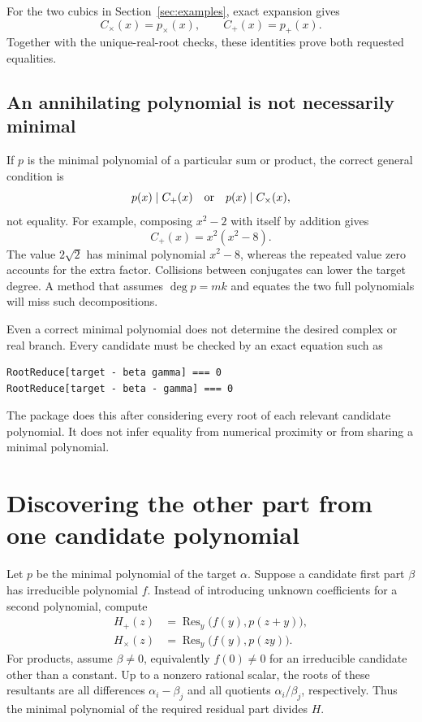 \documentclass[11pt,a4paper]{article}
\theoremstyle{definition}\newtheorem{definition}[theorem]{Definition}
\theoremstyle{remark}\newtheorem{remark}[theorem]{Remark}
\newcommand{\Res}{\operatorname{Res}}
\begin{document}
For the two cubics in Section~\ref{sec:examples}, exact expansion gives
\[
C_{\times}(x)=p_{\times}(x),\qquad C_+(x)=p_+(x).
\]
Together with the unique-real-root checks, these identities prove both requested equalities.

\subsection{An annihilating polynomial is not necessarily minimal}
If $p$ is the minimal polynomial of a particular sum or product, the correct general condition is
\[
p(x)\mid C_+(x)\quad\hbox{or}\quad p(x)\mid C_{\times}(x),
\]
not equality. For example, composing $x^2-2$ with itself by addition gives
\[
C_+(x)=x^2(x^2-8).
\]
The value $2\sqrt2$ has minimal polynomial $x^2-8$, whereas the repeated value zero accounts for the extra factor. Collisions between conjugates can lower the target degree. A method that assumes $\deg p=mk$ and equates the two full polynomials will miss such decompositions.

Even a correct minimal polynomial does not determine the desired complex or real branch. Every candidate must be checked by an exact equation such as
\begin{lstlisting}
RootReduce[target - beta gamma] === 0
RootReduce[target - beta - gamma] === 0
\end{lstlisting}
The package does this after considering every root of each relevant candidate polynomial. It does not infer equality from numerical proximity or from sharing a minimal polynomial.

\section{Discovering the other part from one candidate polynomial}
\label{sec:residual}
Let $p$ be the minimal polynomial of the target $\alpha$. Suppose a candidate first part $\beta$ has irreducible polynomial $f$. Instead of introducing unknown coefficients for a second polynomial, compute
\begin{align}
H_+(z)&=\Res_y\bigl(f(y),p(z+y)\bigr),\label{eq:residualsum}\\
H_{\times}(z)&=\Res_y\bigl(f(y),p(zy)\bigr).\label{eq:residualproduct}
\end{align}
For products, assume $\beta\neq0$, equivalently $f(0)\neq0$ for an irreducible candidate other than a constant. Up to a nonzero rational scalar, the roots of these resultants are all differences $\alpha_i-\beta_j$ and all quotients $\alpha_i/\beta_j$, respectively. Thus the minimal polynomial of the required residual part divides $H$.
\end{document}
